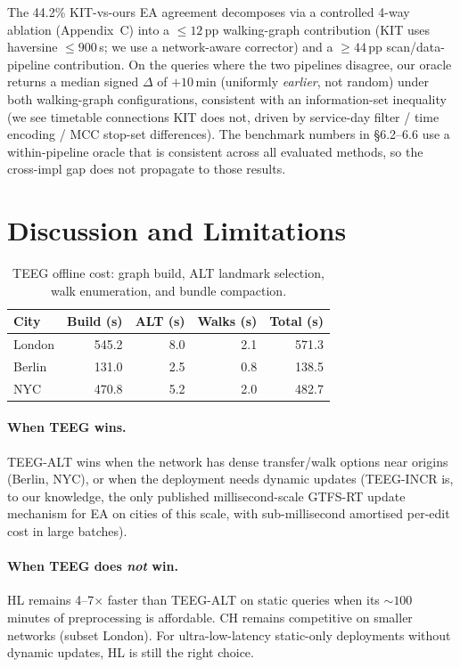 \documentclass[letterpaper]{article}
\theoremstyle{definition}
\theoremstyle{plain}
\begin{document}
The 44.2\% KIT-vs-ours EA agreement decomposes via a controlled 4-way
ablation (Appendix~C) into a $\leq 12$\,pp walking-graph contribution
(KIT uses haversine $\leq\!900$\,s; we use a network-aware corrector)
and a $\geq 44$\,pp scan/data-pipeline contribution. On the queries
where the two pipelines disagree, our oracle returns a median signed
$\Delta$ of $+10$\,min (uniformly \emph{earlier}, not random) under
both walking-graph configurations, consistent with an information-set
inequality (we see timetable connections KIT does not, driven by
service-day filter / time encoding / MCC stop-set differences). The
benchmark numbers in §6.2--6.6 use a within-pipeline oracle that is
consistent across all evaluated methods, so the cross-impl gap does
not propagate to those results.

\section{Discussion and Limitations}

\begin{table}[t]
\centering
\caption{TEEG offline cost: graph build, ALT landmark selection, walk
enumeration, and bundle compaction.}
\label{tab:preproc}
\small
\begin{tabular}{lrrrr}
\toprule
City & Build (s) & ALT (s) & Walks (s) & Total (s) \\
\midrule
London & 545.2 & 8.0 & 2.1 & 571.3 \\
Berlin & 131.0 & 2.5 & 0.8 & 138.5 \\
NYC    & 470.8 & 5.2 & 2.0 & 482.7 \\
\bottomrule
\end{tabular}
\end{table}

\paragraph{When TEEG wins.} TEEG-ALT wins when the network has dense
transfer/walk options near origins (Berlin, NYC), or when the deployment
needs dynamic updates (TEEG-INCR is, to our knowledge, the only published
millisecond-scale GTFS-RT update mechanism for EA on cities of this scale,
with sub-millisecond amortised per-edit cost in large batches).

\paragraph{When TEEG does \emph{not} win.} HL remains 4--7$\times$ faster
than TEEG-ALT on static queries when its $\sim 100$ minutes of preprocessing
is affordable. CH remains competitive on smaller networks (subset London).
For ultra-low-latency static-only deployments without dynamic updates, HL
is still the right choice.
\end{document}
